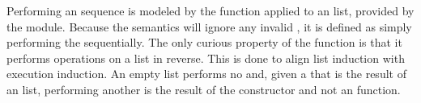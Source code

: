 \begin{figure}
  \COQDOCexecuteSpec{}
  \COQDOCexecuteDef{}
\end{figure}

Performing an \TMop{} sequence is modeled by the \COQexecute{} function applied to an \TMop{} list, provided by the \COQExecution{} module.
Because the semantics will ignore any invalid \TMop{}, it is defined as simply performing the \TMops{} sequentially.
The only curious property of the \COQexecute{} function is that it performs operations on a list in reverse.
This is done to align list induction with execution induction.
An empty list performs no \TMops{} and, given a \TMsystemState{} that is the result of \TMexecuting{} an \TMop{} list, performing another \TMop{} is the result of the  constructor and not an  function.
